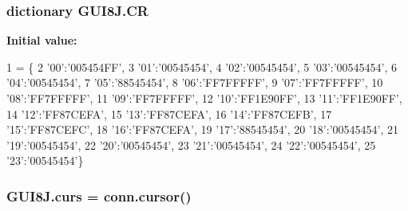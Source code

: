 \subsubsection[{\texorpdfstring{CR}{CR}}]{\setlength{\rightskip}{0pt plus 5cm}dictionary G\+U\+I8\+J.\+CR}\hypertarget{namespaceGUI8J_a22559156071a0e55de6499cb7c11bc13}{}\label{namespaceGUI8J_a22559156071a0e55de6499cb7c11bc13}
{\bfseries Initial value\+:}
\begin{DoxyCode}
1 = \{
2 \textcolor{stringliteral}{'00'}:\textcolor{stringliteral}{'005454FF'},
3 \textcolor{stringliteral}{'01'}:\textcolor{stringliteral}{'00545454'},
4 \textcolor{stringliteral}{'02'}:\textcolor{stringliteral}{'00545454'},
5 \textcolor{stringliteral}{'03'}:\textcolor{stringliteral}{'00545454'},
6 \textcolor{stringliteral}{'04'}:\textcolor{stringliteral}{'00545454'},
7 \textcolor{stringliteral}{'05'}:\textcolor{stringliteral}{'88545454'},
8 \textcolor{stringliteral}{'06'}:\textcolor{stringliteral}{'FF7FFFFF'},
9 \textcolor{stringliteral}{'07'}:\textcolor{stringliteral}{'FF7FFFFF'},
10 \textcolor{stringliteral}{'08'}:\textcolor{stringliteral}{'FF7FFFFF'},
11 \textcolor{stringliteral}{'09'}:\textcolor{stringliteral}{'FF7FFFFF'},
12 \textcolor{stringliteral}{'10'}:\textcolor{stringliteral}{'FF1E90FF'},
13 \textcolor{stringliteral}{'11'}:\textcolor{stringliteral}{'FF1E90FF'},
14 \textcolor{stringliteral}{'12'}:\textcolor{stringliteral}{'FF87CEFA'},
15 \textcolor{stringliteral}{'13'}:\textcolor{stringliteral}{'FF87CEFA'},
16 \textcolor{stringliteral}{'14'}:\textcolor{stringliteral}{'FF87CEFB'},
17 \textcolor{stringliteral}{'15'}:\textcolor{stringliteral}{'FF87CEFC'},
18 \textcolor{stringliteral}{'16'}:\textcolor{stringliteral}{'FF87CEFA'},
19 \textcolor{stringliteral}{'17'}:\textcolor{stringliteral}{'88545454'},
20 \textcolor{stringliteral}{'18'}:\textcolor{stringliteral}{'00545454'},
21 \textcolor{stringliteral}{'19'}:\textcolor{stringliteral}{'00545454'},
22 \textcolor{stringliteral}{'20'}:\textcolor{stringliteral}{'00545454'},
23 \textcolor{stringliteral}{'21'}:\textcolor{stringliteral}{'00545454'},
24 \textcolor{stringliteral}{'22'}:\textcolor{stringliteral}{'00545454'},
25 \textcolor{stringliteral}{'23'}:\textcolor{stringliteral}{'00545454'}\}
\end{DoxyCode}
\subsubsection[{\texorpdfstring{curs}{curs}}]{\setlength{\rightskip}{0pt plus 5cm}G\+U\+I8\+J.\+curs = conn.\+cursor()}\hypertarget{namespaceGUI8J_a9071a3df4f37ae26036b57996e85e7e3}{}\label{namespaceGUI8J_a9071a3df4f37ae26036b57996e85e7e3}
